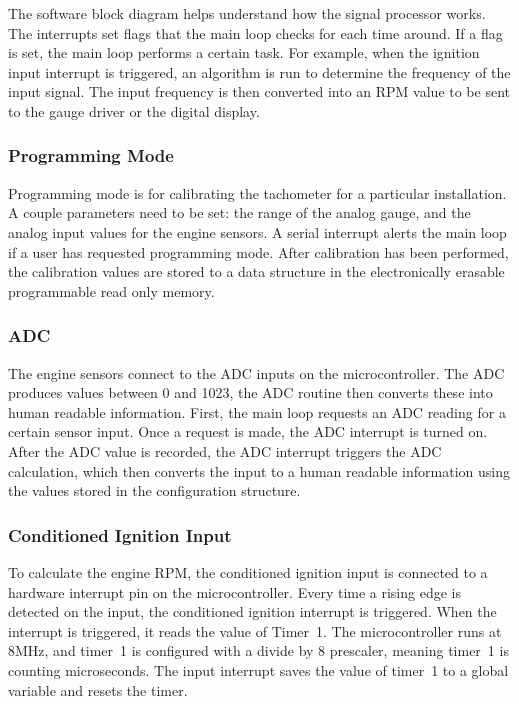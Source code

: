 The software block diagram helps understand how the signal processor works. The interrupts set flags that the main loop checks for each time around. If a flag is set, the main loop performs a certain task. For example, when the ignition input interrupt is triggered, an algorithm is run to determine the frequency of the input signal. The input frequency is then converted into an RPM value to be sent to the gauge driver or the digital display.

\subsubsection{Programming Mode} %
Programming mode is for calibrating the tachometer for a particular installation. A couple parameters need to be set: the range of the analog gauge, and the analog input values for the engine sensors. A serial interrupt alerts the main loop if a user has requested programming mode. After calibration has been performed, the calibration values are stored to a data structure in the electronically erasable programmable read only memory.

\subsubsection{ADC} %
The engine sensors connect to the ADC inputs on the microcontroller. The ADC produces values between 0 and 1023, the ADC routine then converts these into human readable information. First, the main loop requests an ADC reading for a certain sensor input. Once a request is made, the ADC interrupt is turned on. After the ADC value is recorded, the ADC interrupt triggers the ADC calculation, which then converts the input to a human readable information using the values stored in the configuration structure.


\subsubsection{Conditioned Ignition Input} %
To calculate the engine RPM, the conditioned ignition input is connected to a hardware interrupt pin on the microcontroller. Every time a rising edge is detected on the input, the conditioned ignition interrupt is triggered. When the interrupt is triggered, it reads the value of Timer~1. The microcontroller runs at 8MHz, and timer~1 is configured with a divide by 8 prescaler, meaning timer~1 is counting  microseconds. The input interrupt saves the value of timer~1 to a global variable and resets the timer.

